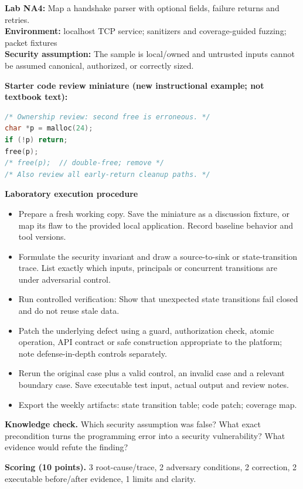 \documentclass[10pt,letterpaper]{article}
\begin{document}
\begin{insight}\textbf{Lab NA4:} Map a handshake parser with optional fields, failure returns and retries.\\\textbf{Environment:} localhost TCP service; sanitizers and coverage-guided fuzzing; packet fixtures\\\textbf{Security assumption:} The sample is local/owned and untrusted inputs cannot be assumed canonical, authorized, or correctly sized.\end{insight}
\textbf{Starter code review miniature (new instructional example; not textbook text):}
\begin{lstlisting}[language=C]
/* Ownership review: second free is erroneous. */
char *p = malloc(24);
if (!p) return;
free(p);
/* free(p);  // double-free; remove */
/* Also review all early-return cleanup paths. */
\end{lstlisting}
\textbf{Laboratory execution procedure}
\begin{itemize}[leftmargin=*,itemsep=2pt]
\item Prepare a fresh working copy. Save the miniature as a discussion fixture, or map its flaw to the provided local application. Record baseline behavior and tool versions.
\item Formulate the security invariant and draw a source-to-sink or state-transition trace. List exactly which inputs, principals or concurrent transitions are under adversarial control.
\item Run controlled verification: Show that unexpected state transitions fail closed and do not reuse stale data.
\item Patch the underlying defect using a guard, authorization check, atomic operation, API contract or safe construction appropriate to the platform; note defense-in-depth controls separately.
\item Rerun the original case plus a valid control, an invalid case and a relevant boundary case. Save executable test input, actual output and review notes.
\item Export the weekly artifacts: state transition table; code patch; coverage map.
\end{itemize}
\textbf{Knowledge check.} Which security assumption was false? What exact precondition turns the programming error into a security vulnerability? What evidence would refute the finding?

\textbf{Scoring (10 points).} 3 root-cause/trace, 2 adversary conditions, 2 correction, 2 executable before/after evidence, 1 limits and clarity.
\end{document}
